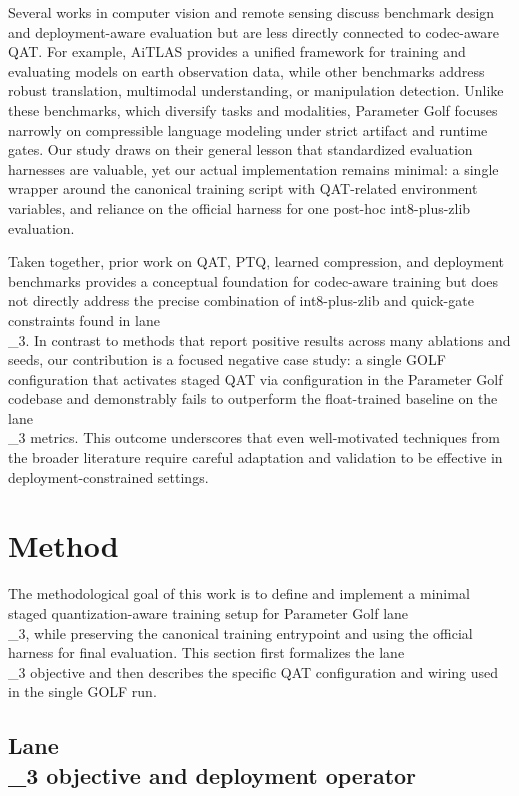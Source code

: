 \documentclass{article}
\begin{document}
Several works in computer vision and remote sensing discuss benchmark design and deployment-aware evaluation but are less directly connected to codec-aware QAT. For example, AiTLAS provides a unified framework for training and evaluating models on earth observation data, while other benchmarks address robust translation, multimodal understanding, or manipulation detection. Unlike these benchmarks, which diversify tasks and modalities, Parameter Golf focuses narrowly on compressible language modeling under strict artifact and runtime gates. Our study draws on their general lesson that standardized evaluation harnesses are valuable, yet our actual implementation remains minimal: a single wrapper around the canonical training script with QAT-related environment variables, and reliance on the official harness for one post-hoc int8-plus-zlib evaluation.

Taken together, prior work on QAT, PTQ, learned compression, and deployment benchmarks provides a conceptual foundation for codec-aware training but does not directly address the precise combination of int8-plus-zlib and quick-gate constraints found in lane\\_3. In contrast to methods that report positive results across many ablations and seeds, our contribution is a focused negative case study: a single GOLF configuration that activates staged QAT via configuration in the Parameter Golf codebase and demonstrably fails to outperform the float-trained baseline on the lane\\_3 metrics. This outcome underscores that even well-motivated techniques from the broader literature require careful adaptation and validation to be effective in deployment-constrained settings.

\section{Method}

\label{sec:method}

The methodological goal of this work is to define and implement a minimal staged quantization-aware training setup for Parameter Golf lane\\_3, while preserving the canonical training entrypoint and using the official harness for final evaluation. This section first formalizes the lane\\_3 objective and then describes the specific QAT configuration and wiring used in the single GOLF run.

\subsection{Lane\\_3 objective and deployment operator}
\end{document}
